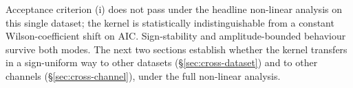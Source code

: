 Acceptance criterion (i) does not pass under the headline non-linear
analysis on this single dataset; the kernel is statistically
indistinguishable from a constant Wilson-coefficient shift on AIC.
Sign-stability and amplitude-bounded behaviour survive both modes.
The next two sections establish whether the kernel transfers in a
sign-uniform way to other datasets (\S\ref{sec:cross-dataset}) and
to other channels (\S\ref{sec:cross-channel}), under the full
non-linear analysis.
